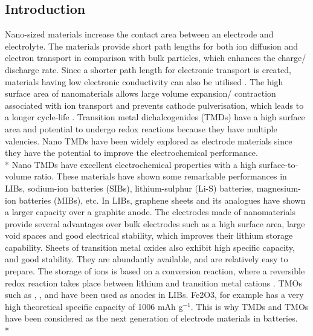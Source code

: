 \subsection{Introduction}
Nano-sized materials increase the contact area between an electrode and electrolyte. The materials provide short path lengths for both ion diffusion and electron transport in comparison with bulk particles, which enhances the charge/ discharge rate. Since a shorter path length for electronic transport is created, materials having low electronic conductivity can also be utilised \cite{pitchai_nanostructured_2011}. The high surface area of nanomaterials allows large volume expansion/ contraction associated with ion transport and prevents cathode pulverisation, which leads to a longer cycle-life \cite{zhang_ultrathin_2015, cong_intrinsic_2015}. Transition metal dichalcogenides (TMDs) have a high surface area and potential to undergo redox reactions because they have multiple valencies. Nano TMDs have been widely explored as electrode materials since they have the potential to improve the electrochemical performance.  \\*
Nano TMDs have excellent electrochemical properties with a high surface-to-volume ratio. These materials have shown some remarkable performances in LIBs, sodium-ion batteries (SIBs), lithium-sulphur (Li-S) batteries, magnesium-ion batteries (MIBs), etc. In LIBs, graphene sheets and its analogues have shown a larger capacity over a graphite anode. The electrodes made of nanomaterials provide several advantages over bulk electrodes such as a high surface area, large void spaces and good electrical stability, which improves their lithium storage capability. Sheets of transition metal oxides also exhibit high specific capacity, and good stability. They are abundantly available, and are relatively easy to prepare. The storage of  ions is based on a conversion reaction, where a reversible redox reaction takes place between lithium and transition metal cations \cite{reddy}. TMOs
such as , ,  and  have been used as anodes in LIBs. Fe2O3, for example has a very high theoretical specific capacity of 1006 mAh g$^{-1}$. This is why TMDs and TMOs have been considered as the next generation of electrode materials in batteries. \\*

